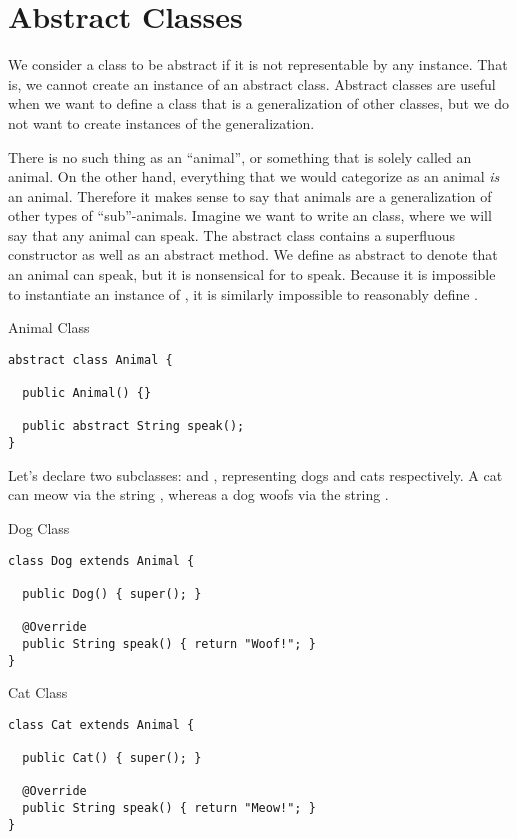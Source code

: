 \section{Abstract Classes}

We consider a class to be abstract if it is not representable by any instance. That is, we cannot create an instance of an abstract class. Abstract classes are useful when we want to define a class that is a generalization of other classes, but we do not want to create instances of the generalization.

 There is no such thing as an ``animal'', or something that is solely called an animal. On the other hand, everything that we would categorize as an animal \textit{is} an animal. Therefore it makes sense to say that animals are a generalization of other types of ``sub''-animals. Imagine we want to write an  class, where we will say that any animal can speak. The abstract class contains a superfluous constructor as well as an abstract  method. We define  as abstract to denote that an animal can speak, but it is nonsensical for  to speak. Because it is impossible to instantiate an instance of , it is similarly impossible to reasonably define .

\begin{cl}[]{Animal Class}
\begin{lstlisting}[language=MyJava]
abstract class Animal {

  public Animal() {} 

  public abstract String speak();
}
\end{lstlisting}
\end{cl}

Let's declare two subclasses:  and , representing dogs and cats respectively. A cat can meow via the string , whereas a dog woofs via the string . 

\begin{cl}[]{Dog Class}
\begin{lstlisting}[language=MyJava]
class Dog extends Animal {

  public Dog() { super(); }

  @Override
  public String speak() { return "Woof!"; }
}
\end{lstlisting}
\end{cl}

\begin{cl}[]{Cat Class}
\begin{lstlisting}[language=MyJava]
class Cat extends Animal {

  public Cat() { super(); }

  @Override
  public String speak() { return "Meow!"; }
}
\end{lstlisting}
\end{cl}

